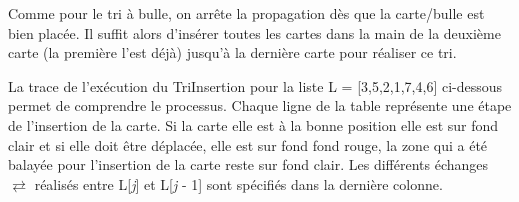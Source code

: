 \documentclass[a4paper,10pt]{article}
\begin{document}


Comme pour le tri à bulle, on arrête la propagation dès que la carte/bulle est bien placée. 
Il suffit alors d'insérer toutes les cartes dans la main de la deuxième carte (la première l'est déjà) 
jusqu'à la dernière carte pour réaliser ce tri.



La trace de l'exécution du TriInsertion pour la liste L = [3,5,2,1,7,4,6] ci-dessous permet de comprendre le processus. 
Chaque ligne de la table représente une étape de l'insertion de la carte. Si la carte elle est à la bonne 
position elle est sur fond clair et si elle doit être déplacée, elle est sur fond fond rouge, la zone qui a 
été balayée pour l'insertion de la carte reste sur fond clair. Les différents échanges $\rightleftarrows$
réalisés entre L[{\itshape j}] et L[{\itshape j} - 1] sont spécifiés dans la dernière colonne.
\end{document}
